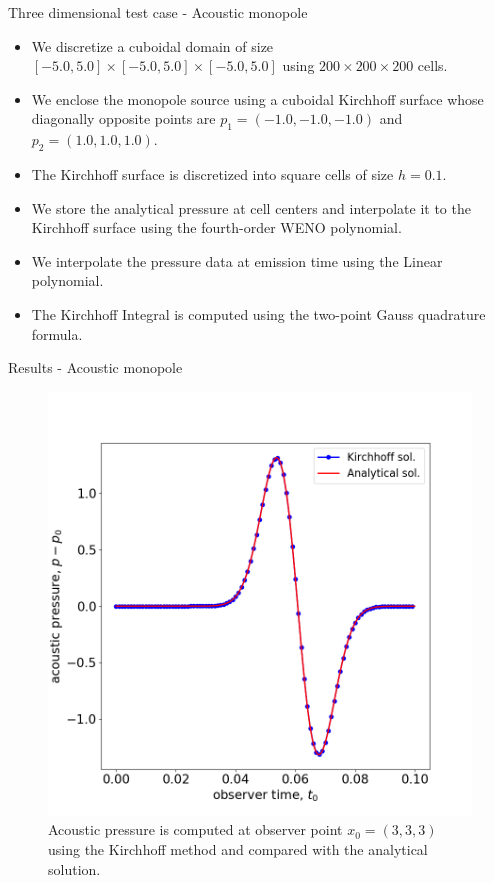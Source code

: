 \documentclass[10pt, aspectratio=169]{beamer}
\begin{document}
\begin{frame}{Three dimensional test case - Acoustic monopole}
	\begin{itemize}
		\item We discretize a cuboidal domain of size $[-5.0,5.0]\times[-5.0,5.0]\times[-5.0,5.0]$ using $200 \times 200 \times 200$ cells.
		\item We enclose the monopole source using a cuboidal Kirchhoff surface whose diagonally opposite points are $p_{1} = (-1.0, -1.0, -1.0)$
		and $p_{2} = (1.0, 1.0, 1.0)$.
		\item The Kirchhoff surface is discretized into square cells of size $h = 0.1$.
		\item We store the analytical pressure at cell centers and interpolate it to the Kirchhoff surface using the fourth-order WENO polynomial.
		\item We interpolate the pressure data at emission time using the Linear polynomial.
		\item The Kirchhoff Integral is computed using the two-point Gauss quadrature formula.
	\end{itemize}
\end{frame}

\begin{frame}{Results - Acoustic monopole}
	\begin{figure}
		\centering
		\includegraphics[scale=0.26]{images/monopole.png}
		\caption{Acoustic pressure is computed at observer point $x_{0} = (3, 3, 3)$ using the Kirchhoff method and compared with the analytical solution.}
	\end{figure}
\end{frame}
\end{document}
